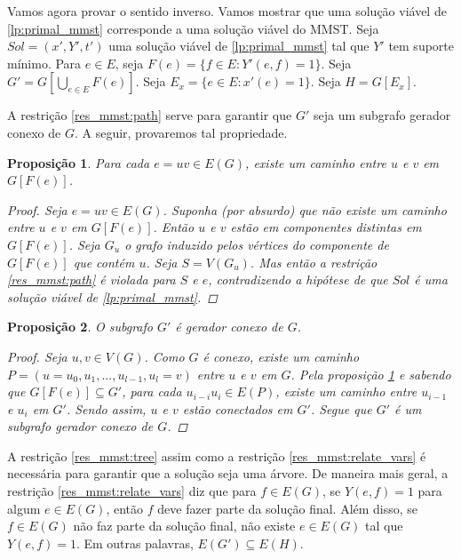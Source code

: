 \documentclass[11pt,reqno]{amsart}
\newtheorem{proposicao}{Proposição}
\begin{document}
Vamos agora provar o sentido inverso. Vamos mostrar que uma solução viável de 
\ref{lp:primal_mmst} corresponde a uma solução viável do MMST. 
Seja $Sol = (x',Y',t')$ uma solução viável de \ref{lp:primal_mmst} 
tal que $Y'$ tem suporte mínimo. 
Para $e \in E$, seja $F(e) = \{f \in E: Y'(e,f) = 1\}$. 
Seja $G' = G[\bigcup_{e \in E}F(e)]$. 
Seja $E_{x} = \{e \in E: x'(e) = 1\}$. Seja $H = G[E_{x}]$.

A restrição \ref{res_mmst:path}
serve para garantir que $G'$ seja um subgrafo gerador conexo de $G$. A 
seguir, provaremos tal propriedade.

\begin{proposicao}
\label{prop:Yuv_caminho}
Para cada $e = uv \in E(G)$, existe um caminho entre $u$ e $v$ em 
$G[F(e)]$.
\begin{proof}
Seja $e = uv \in E(G)$. Suponha (por absurdo) que não existe um 
caminho entre $u$ e $v$ em $G[F(e)]$. Então $u$ e $v$ estão 
em componentes distintas em $G[F(e)]$. Seja $G_u$ o grafo induzido pelos 
vértices do componente de $G[F(e)]$ que contém $u$. Seja $S = V(G_u)$. Mas 
então a restrição \ref{res_mmst:path} é violada para $S$ e $e$, 
contradizendo a hipótese de que $Sol$ é uma solução 
viável de \ref{lp:primal_mmst}.
\end{proof}
\end{proposicao}

\begin{proposicao}
\label{prop:gerador_conexo_G}
O subgrafo $G'$ é gerador conexo de $G$.
\begin{proof}
Seja $u,v \in V(G)$. Como $G$ é conexo, existe um caminho 
$P = (u = u_0, u_1, ..., u_{l-1}, u_l = v)$ entre $u$ e $v$ em $G$. 
Pela proposição \ref{prop:Yuv_caminho} e sabendo que $G[F(e)] \subseteq G'$, 
para cada $u_{i-i}u_{i} \in E(P)$, existe um caminho entre $u_{i-1}$ e 
$u_{i}$ em $G'$. 
Sendo assim, $u$ e $v$ estão conectados em $G'$. Segue que $G'$ é um 
subgrafo gerador conexo de $G$.
\end{proof}
\end{proposicao}

A restrição \ref{res_mmst:tree} assim como a restrição 
\ref{res_mmst:relate_vars} é necessária para garantir que a solução seja  
uma árvore. De maneira mais geral, a restrição \ref{res_mmst:relate_vars} 
diz que para $f \in E(G)$, se $Y(e,f) = 1$ para algum $e \in E(G)$, então $f$ 
deve fazer parte da solução final. Além disso, se $f \in E(G)$ 
não faz parte da solução final, não existe $e \in E(G)$ tal que $Y(e,f) = 1$. 
Em outras palavras, $E(G') \subseteq E(H)$.
\end{document}
